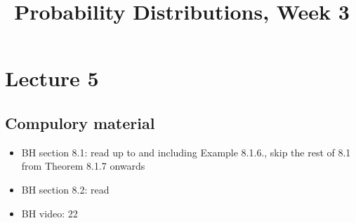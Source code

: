 


\title{Probability Distributions, Week 3}


\maketitle
\toccontents

\section{Lecture 5}

\subsection{Compulory material}
\label{sec:compulory-material}



\begin{itemize}
\item BH section 8.1: read up  to and including Example 8.1.6., skip the rest of 8.1 from Theorem 8.1.7  onwards
\item BH section 8.2: read
\item BH video: 22
\end{itemize}




